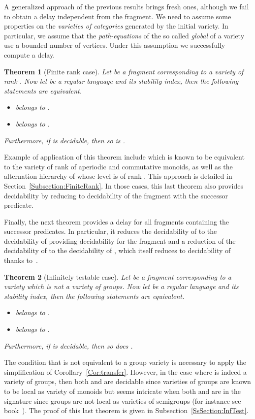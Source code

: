 \documentclass[submission,hidelink]{dmtcs-episciences}
\newtheorem{theorem}{Theorem}
\begin{document}
A generalized approach of the previous results brings fresh ones, although we fail to obtain a delay independent from the fragment.
We need to assume some properties on the \emph{varieties of categories} generated by the initial variety. In particular, we assume
that the \emph{path-equations} of the so called \emph{global} of a variety use a bounded number of vertices. Under this assumption we successfully compute a delay.
\begin{theorem}[Finite rank case]\label{Main:finiterank}
Let  be a fragment corresponding to a variety  of rank .
Now let  be a regular language and  its stability index, then the following statements are equivalent.
\begin{itemize}
	\item   belongs to .
	\item   belongs to .
\end{itemize}
Furthermore, if  is decidable, then so is .
\end{theorem}
Example of application of this theorem include  which is known to be equivalent to the variety of rank  of aperiodic and
commutative monoids, as well as the alternation hierarchy of  whose  level is of rank . This approach is detailed in Section~\ref{Subsection:FiniteRank}. In those cases, this last theorem also provides decidability by reducing to decidability of
the fragment with the successor predicate.

Finally, the next theorem provides a delay for all fragments containing the successor predicates. In particular,
it reduces the decidability of  to the decidability of  providing decidability for the fragment
 and a reduction of the decidability of  to the decidability of , which itself reduces
to decidability of  thanks to~\cite{Straubing85}.
\begin{theorem}[Infinitely testable case]\label{Main:InfTest}
Let  be a fragment corresponding to a variety  which is not a variety of groups.
Now let  be a regular language and  its stability index, then the following statements are equivalent.
\begin{itemize}
	\item   belongs to .
	\item   belongs to .
\end{itemize}
Furthermore, if  is decidable, then so does .
\end{theorem}
The condition that  is not equivalent to a group variety is necessary to apply the simplification of Corollary~\ref{Cor:transfer}.
However, in the case where  is indeed a variety of groups, then both  and  are decidable
since varieties of groups are known to be local as variety of monoids but seems intricate when both  and  are in the signature since groups are not local as varieties of semigroups (for instance see book~\cite[page 104]{RS09}).
The proof of this last theorem is given in Subsection~\ref{SsSection:InfTest}.
\end{document}
